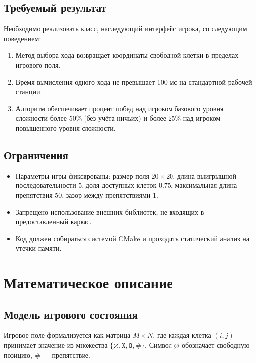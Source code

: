 \documentclass[12pt,a4paper]{article}
\begin{document}
\subsection{Требуемый результат}
Необходимо реализовать класс, наследующий интерфейс игрока, со следующим поведением:
\begin{enumerate}
    \item Метод выбора хода возвращает координаты свободной клетки в пределах игрового поля.
    \item Время вычисления одного хода не превышает 100 мс на стандартной рабочей станции.
    \item Алгоритм обеспечивает процент побед над игроком базового уровня сложности более 50\% (без учёта ничьих) и более 25\% над игроком повышенного уровня сложности.
\end{enumerate}

\subsection{Ограничения}
\begin{itemize}
    \item Параметры игры фиксированы: размер поля $20 \times 20$, длина выигрышной последовательности $5$, доля доступных клеток $0.75$, максимальная длина препятствия $50$, зазор между препятствиями $1$.
    \item Запрещено использование внешних библиотек, не входящих в предоставленный каркас.
    \item Код должен собираться системой CMake и проходить статический анализ на утечки памяти.
\end{itemize}

\section{Математическое описание}

\subsection{Модель игрового состояния}
Игровое поле формализуется как матрица $M \times N$, где каждая клетка $(i, j)$ принимает значение из множества $\{ \varnothing, \texttt{X}, \texttt{O}, \texttt{\#} \}$. Символ $\varnothing$ обозначает свободную позицию, $\texttt{\#}$ — препятствие.
\end{document}
